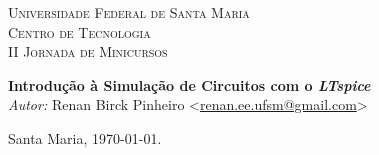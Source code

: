 \begin{titlepage}
\begin{center}

\textsc{\LARGE Universidade Federal de Santa Maria}\\[1.5cm]
\textsc{\Large Centro de Tecnologia}\\[0.5cm]
\textsc{\Large II Jornada de Minicursos}\\[0.5cm]

\end{center}

\vspace*{5cm}
\begin{center}
{\huge \bfseries Introdução à Simulação de Circuitos com o \textit{LTspice}}\\[0.4cm]
\vspace*{130px}
\emph{Autor:}
Renan Birck Pinheiro <\url{renan.ee.ufsm@gmail.com}>


Santa Maria, \today.

\end{center}




\end{titlepage}